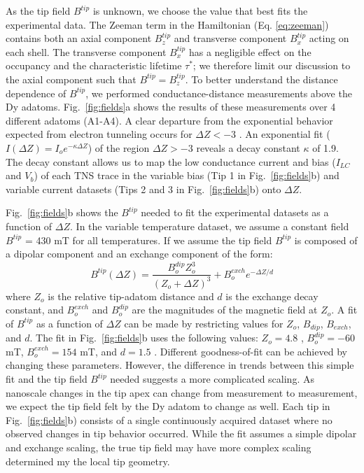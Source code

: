 \documentclass[reprint,amsmath,amssymb,aps,nofootinbib,onecolumn]{revtex4-2}
\begin{document}
As the tip field $B^{tip}$ is unknown, we choose the value that best fits the experimental data. The Zeeman term in the Hamiltonian (Eq. \ref{eq:zeeman}) contains both an axial component $B^{tip}_z$ and transverse component $B^{tip}_x$ acting on each shell. The transverse component $B^{tip}_x$ has a negligible effect on the occupancy and the characteristic lifetime $\tau^{*}$; we therefore limit our discussion to the axial component such that $B^{tip} = B^{tip}_z$. 
To better understand the distance dependence of $B^{tip}$, we performed conductance-distance measurements above the Dy adatoms. Fig.~\ref{fig:fields}a shows the results of these measurements over 4 different adatoms (A1-A4). A clear departure from the exponential behavior expected from electron tunneling occurs for $\Delta Z < -3$ \text{\normalfont\AA}. An exponential fit ($I(\Delta Z) = I_o e^{-\kappa \Delta Z}$) of the region $\Delta Z > -3$ \text{\normalfont\AA} reveals a decay constant $\kappa$ of 1.9. The decay constant allows us to map the low conductance current and bias ($I_{LC}$ and $V_{b}$) of each TNS trace in the variable bias (Tip 1 in Fig.~\ref{fig:fields}b) and variable current datasets (Tips 2 and 3 in Fig.~\ref{fig:fields}b) onto $\Delta Z$. 

Fig.~\ref{fig:fields}b shows the $B^{tip}$ needed to fit the experimental datasets as a function of $\Delta Z$. In the variable temperature dataset, we assume a constant field $B^{tip}$ = 430 mT for all temperatures. If we assume the tip field $B^{tip}$ is composed of a dipolar component and an exchange component of the form:
\begin{equation}
B^{tip}(\Delta Z) =  \frac{B^{dip}_{o} Z^{3}_{o}}{(Z_{o}+\Delta Z)^{3}} + B^{exch}_{o} e^{-\Delta Z/d}
\label{eq:fit}
\end{equation}
where $Z_o$ is the relative tip-adatom distance and $d$ is the exchange decay constant, and $B^{exch}_{o}$ and $B^{dip}_{o}$ are the magnitudes of the magnetic field at $Z_o$. A fit of $B^{tip}$ as a function of $\Delta Z$ can be made by restricting values for $Z_o$, $B_{dip}$, $B_{exch}$, and $d$. The fit in Fig.~\ref{fig:fields}b uses the following values: $Z_o = 4.8$ \text{\normalfont\AA}, $B^{dip}_o = -60$ mT, $B^{exch}_o = 154$ mT, and $d = 1.5$ \text{\normalfont\AA}. Different goodness-of-fit can be achieved by changing these parameters. However, the difference in trends between this simple fit and the tip field $B^{tip}$ needed suggests a more complicated scaling. As nanoscale changes in the tip apex can change from measurement to measurement, we expect the tip field felt by the Dy adatom to change as well. Each tip in Fig.~\ref{fig:fields}b) consists of a single continuously acquired dataset where no observed changes in tip behavior occurred. While the fit assumes a simple dipolar and exchange scaling, the true tip field may have more complex scaling determined my the local tip geometry.
\end{document}
